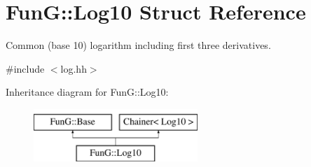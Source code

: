 \hypertarget{structFunG_1_1Log10}{}\section{Fun\+G\+:\+:Log10 Struct Reference}
\label{structFunG_1_1Log10}


Common (base 10) logarithm including first three derivatives.  




{\ttfamily \#include $<$log.\+hh$>$}

Inheritance diagram for Fun\+G\+:\+:Log10\+:\begin{figure}[H]
\begin{center}
\leavevmode
\includegraphics[height=2.000000cm]{structFunG_1_1Log10}
\end{center}
\end{figure}
